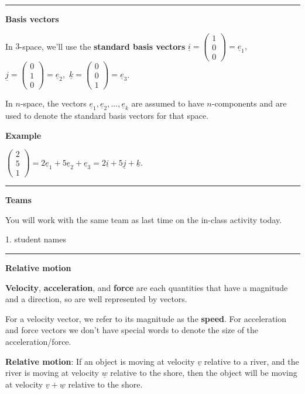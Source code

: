 \documentclass[12pt,letterpaper,noanswers]{exam}
\newcommand{\mb}[1]{\underline{#1}}
\begin{document}
\vspace{0.2cm}
\hrule
\vspace{0.2cm}

\eject

\noindent\textbf{Basis vectors}
\begin{tcolorbox}
In $3$-space, we'll use the \textbf{standard basis vectors} $\mb{i} = \left(\begin{array}{c} 1 \\ 0 \\0 \end{array}\right) = \mb{e}_1,$ $\mb{j} = \left(\begin{array}{c} 0 \\ 1 \\0 \end{array}\right)= \mb{e}_2,$ $\mb{k} = \left(\begin{array}{c} 0 \\ 0 \\ 1 \end{array}\right)= \mb{e}_3$.

In $n$-space, the vectors $\mb{e}_1,\mb{e}_2,...,\mb{e}_k$ are assumed to have $n$-components and are used to denote the standard basis vectors for that space.
\end{tcolorbox}

\noindent\textbf{Example}

$\left(\begin{array}{c} 2 \\ 5 \\ 1 \end{array}\right) = 2\mb{e}_1+5\mb{e}_2 + \mb{e}_3 = 2\mb{i}+5\mb{j}+\mb{k}.$


\vspace{0.2cm}
\hrule
\vspace{0.2cm}

\noindent\textbf{Teams}

You will work with the same team as last time on the in-class activity today.  
\begin{multicols}{2}

1.  student names

\end{multicols}

\vspace{0.2cm}
\hrule
\vspace{0.2cm}

\noindent\textbf{Relative motion}

\begin{tcolorbox}
\textbf{Velocity}, \textbf{acceleration}, and \textbf{force} are each quantities that have a magnitude and a direction, so are well represented by vectors.  

For a velocity vector, we refer to its magnitude as the \textbf{speed}.  For acceleration and force vectors we don't have special words to denote the size of the acceleration/force.

\textbf{Relative motion}: If an object is moving at velocity $\mb{v}$ relative to a river, and the river is moving at velocity $\mb{w}$ relative to the shore, then the object will be moving at velocity $\mb{v} + \mb{w}$ relative to the shore.
\end{tcolorbox}
\end{document}
